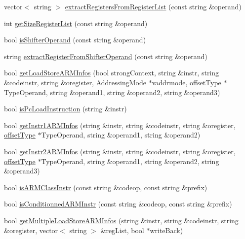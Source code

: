 \begin{DoxyCompactItemize}
\item 
vector$<$ string $>$ \hyperlink{classMIPS_a6eecdd7a94436748b1bc224cf78ac075}{extract\+Registers\+From\+Register\+List} (const string \&operand)
\item 
int \hyperlink{classMIPS_a475db73349cc940f47e5e0c310ac8912}{get\+Size\+Register\+List} (const string \&operand)
\item 
bool \hyperlink{classMIPS_a9390579a78d85c1024dcde783bff27b7}{is\+Shifter\+Operand} (const string \&operand)
\item 
string \hyperlink{classMIPS_ae48954f0e93827c1cb8225cac3857464}{extract\+Register\+From\+Shifter\+Operand} (const string \&operand)
\item 
bool \hyperlink{classMIPS_a2aa733a21db8dc973feddaac233d66a2}{get\+Load\+Store\+A\+R\+M\+Infos} (bool strong\+Context, string \&instr, string \&codeinstr, string \&oregister, \hyperlink{arch_8h_aa5cfff0cd9c5ad5ebda7aeecc4a50c2b}{Addressing\+Mode} $\ast$vaddrmode, \hyperlink{arch_8h_a63b66e201ffc27bbc8f89c8808382044}{offset\+Type} $\ast$Type\+Operand, string \&operand1, string \&operand2, string \&operand3)
\item 
bool \hyperlink{classMIPS_ae38afe5659e9efe2ff909fa5c4acc047}{is\+Pc\+Load\+Instruction} (string \&instr)
\item 
bool \hyperlink{classMIPS_add97e24f0dff226385044368b82cb6f1}{get\+Instr1\+A\+R\+M\+Infos} (string \&instr, string \&codeinstr, string \&oregister, \hyperlink{arch_8h_a63b66e201ffc27bbc8f89c8808382044}{offset\+Type} $\ast$Type\+Operand, string \&operand1, string \&operand2)
\item 
bool \hyperlink{classMIPS_aefb9849f91cfe9bcb6baa71bcf0b4aa8}{get\+Instr2\+A\+R\+M\+Infos} (string \&instr, string \&codeinstr, string \&oregister, \hyperlink{arch_8h_a63b66e201ffc27bbc8f89c8808382044}{offset\+Type} $\ast$Type\+Operand, string \&operand1, string \&operand2, string \&operand3)
\item 
bool \hyperlink{classMIPS_aa234e9a3a6942ce0a38894fa4caddbd9}{is\+A\+R\+M\+Class\+Instr} (const string \&codeop, const string \&prefix)
\item 
bool \hyperlink{classMIPS_a1ef435e9100290e46e91863960b64c71}{is\+Conditionned\+A\+R\+M\+Instr} (const string \&codeop, const string \&prefix)
\item 
bool \hyperlink{classMIPS_ae09bc40a4598430935a4deb91e81703c}{get\+Multiple\+Load\+Store\+A\+R\+M\+Infos} (string \&instr, string \&codeinstr, string \&oregister, vector$<$ string $>$ \&reg\+List, bool $\ast$write\+Back)
\item 

\end{DoxyCompactItemize}
